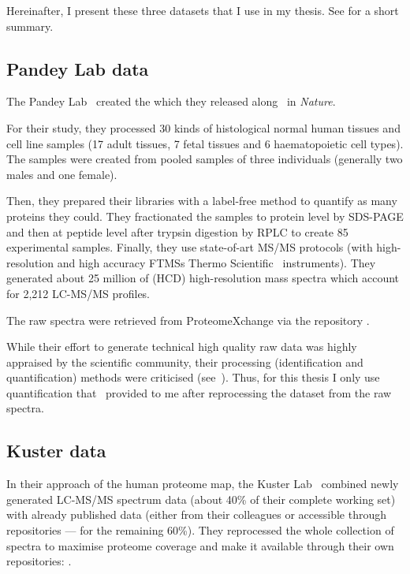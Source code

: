 Hereinafter, I present these three datasets that I use in my thesis.
See  for a short summary.

\subsection{Pandey Lab data}

The Pandey Lab~ created the
 which
they released along~ in \emph{Nature}.

For their study, they processed 30 kinds of histological normal human
tissues and cell line samples (17 adult tissues, 7 fetal tissues and 6
haematopoietic cell types). The samples were created from pooled samples of three
individuals (generally two males and one female).

Then, they prepared their libraries with a label-free method to quantify
as many proteins they could. They fractionated the samples to protein level by
\gls{SDS-PAGE} and then at peptide level after trypsin digestion by \gls{RPLC}
to create 85 experimental samples. Finally, they use state-of-art \gls{MS/MS}
protocols (with high-resolution and high accuracy \glspl{FTMS}
Thermo Scientific \orbi\ instruments).
They generated about 25 million of (\gls{HCD})
high-resolution mass spectra which account for 2,212 \gls{LC-MS/MS} profiles.

The raw spectra were retrieved from ProteomeXchange via the repository
.

While their effort to generate technical high quality raw data was highly
appraised by the scientific community, their processing
(identification and quantification) methods were
criticised (see~).
Thus, for this thesis I only use
quantification that \james\ provided to me after reprocessing the dataset
from the raw spectra.

\subsection{Kuster data}

In their approach of the human proteome map, the Kuster Lab~
combined newly generated \gls{LC-MS/MS} spectrum data (about 40\% of their
complete working set) with already published data (either from their colleagues
or accessible through repositories --- for the remaining 60\%). They reprocessed
the whole collection of spectra to maximise proteome coverage
and make it available through their own repositories:
.

